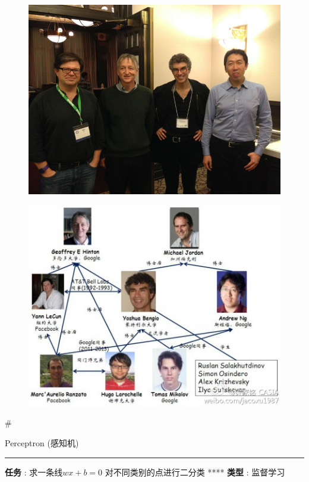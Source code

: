 \documentclass[11pt]{article}
\makeatletter
\def\maxwidth{\ifdim\Gin@nat@width>\linewidth\linewidth
    \else\Gin@nat@width\fi}
\let\Oldincludegraphics\includegraphics
\renewcommand{\includegraphics}[1]{\Oldincludegraphics[width=.8\maxwidth]{#1}}
\makeatother
\begin{document}
    \begin{figure}
\centering
\includegraphics{ml_people.jpg}
\caption{}
\end{figure}

    \begin{figure}
\centering
\includegraphics{ml_relation.jpg}
\caption{}
\end{figure}

    \#

Perceptron (感知机)

\begin{center}\rule{0.5\linewidth}{\linethickness}\end{center}

\textbf{任务} : 求一条线\(wx+b=0\) 对不同类别的点进行二分类 ****
\textbf{类型} : 监督学习
\end{document}
